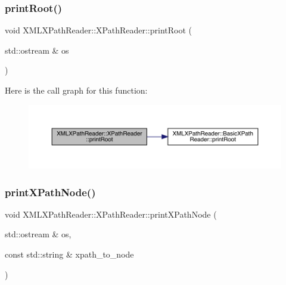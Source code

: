 \subsubsection{\texorpdfstring{printRoot()}{printRoot()}\hspace{0.1cm}{\footnotesize\ttfamily [2/2]}}
{\footnotesize\ttfamily void X\+M\+L\+X\+Path\+Reader\+::\+X\+Path\+Reader\+::print\+Root (\begin{DoxyParamCaption}\item[{std\+::ostream \&}]{os }\end{DoxyParamCaption})\hspace{0.3cm}{\ttfamily [inline]}}

Here is the call graph for this function\+:
\nopagebreak
\begin{figure}[H]
\begin{center}
\leavevmode
\includegraphics[width=350pt]{d3/d5a/classXMLXPathReader_1_1XPathReader_a9634a8955fc1b2c8bc086b95f7fa2c1f_cgraph}
\end{center}
\end{figure}
\mbox{\label{classXMLXPathReader_1_1XPathReader_a8f751fb071319179252a48075239559c}} 
\subsubsection{\texorpdfstring{printXPathNode()}{printXPathNode()}\hspace{0.1cm}{\footnotesize\ttfamily [1/2]}}
{\footnotesize\ttfamily void X\+M\+L\+X\+Path\+Reader\+::\+X\+Path\+Reader\+::print\+X\+Path\+Node (\begin{DoxyParamCaption}\item[{std\+::ostream \&}]{os,  }\item[{const std\+::string \&}]{xpath\+\_\+to\+\_\+node }\end{DoxyParamCaption})\hspace{0.3cm}{\ttfamily [inline]}}

